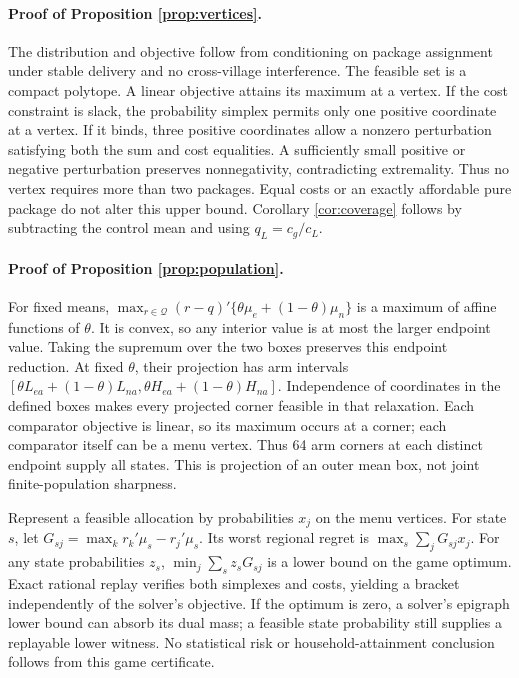 \documentclass[11pt]{article}
\begin{document}
\paragraph{Proof of Proposition \ref{prop:vertices}.}
The distribution and objective follow from conditioning on package assignment under stable delivery and no cross-village interference. The feasible set is a compact polytope. A linear objective attains its maximum at a vertex. If the cost constraint is slack, the probability simplex permits only one positive coordinate at a vertex. If it binds, three positive coordinates allow a nonzero perturbation satisfying both the sum and cost equalities. A sufficiently small positive or negative perturbation preserves nonnegativity, contradicting extremality. Thus no vertex requires more than two packages. Equal costs or an exactly affordable pure package do not alter this upper bound. Corollary \ref{cor:coverage} follows by subtracting the control mean and using $q_L=c_g/c_L$.

\paragraph{Proof of Proposition \ref{prop:population}.}
For fixed means, $\max_{r\in\mathcal Q}(r-q)'\{\theta\mu_e+(1-\theta)\mu_n\}$ is a maximum of affine functions of $\theta$. It is convex, so any interior value is at most the larger endpoint value. Taking the supremum over the two boxes preserves this endpoint reduction. At fixed $\theta$, their projection has arm intervals $[\theta L_{ea}+(1-\theta)L_{na},\theta H_{ea}+(1-\theta)H_{na}]$. Independence of coordinates in the defined boxes makes every projected corner feasible in that relaxation. Each comparator objective is linear, so its maximum occurs at a corner; each comparator itself can be a menu vertex. Thus 64 arm corners at each distinct endpoint supply all states. This is projection of an outer mean box, not joint finite-population sharpness.

Represent a feasible allocation by probabilities $x_j$ on the menu vertices. For state $s$, let $G_{sj}=\max_k r_k'\mu_s-r_j'\mu_s$. Its worst regional regret is $\max_s\sum_jG_{sj}x_j$. For any state probabilities $z_s$, $\min_j\sum_sz_sG_{sj}$ is a lower bound on the game optimum. Exact rational replay verifies both simplexes and costs, yielding a bracket independently of the solver's objective. If the optimum is zero, a solver's epigraph lower bound can absorb its dual mass; a feasible state probability still supplies a replayable lower witness. No statistical risk or household-attainment conclusion follows from this game certificate.
\end{document}
